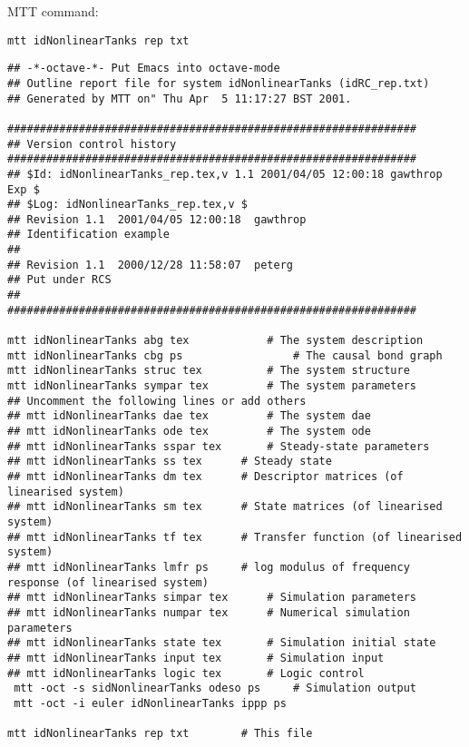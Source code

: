 MTT command:
\begin{verbatim}
mtt idNonlinearTanks rep txt 
\end{verbatim}
  \begin{verbatim}
## -*-octave-*- Put Emacs into octave-mode
## Outline report file for system idNonlinearTanks (idRC_rep.txt)
## Generated by MTT on" Thu Apr  5 11:17:27 BST 2001.

###############################################################
## Version control history
###############################################################
## $Id: idNonlinearTanks_rep.tex,v 1.1 2001/04/05 12:00:18 gawthrop Exp $
## $Log: idNonlinearTanks_rep.tex,v $
## Revision 1.1  2001/04/05 12:00:18  gawthrop
## Identification example
##
## Revision 1.1  2000/12/28 11:58:07  peterg
## Put under RCS
##
###############################################################

mtt idNonlinearTanks abg tex			# The system description
mtt idNonlinearTanks cbg ps 		        # The causal bond graph
mtt idNonlinearTanks struc tex	        # The system structure
mtt idNonlinearTanks sympar tex	        # The system parameters
## Uncomment the following lines or add others
## mtt idNonlinearTanks dae tex	        # The system dae
## mtt idNonlinearTanks ode tex	        # The system ode 
## mtt idNonlinearTanks sspar tex		# Steady-state parameters
## mtt idNonlinearTanks ss tex 		# Steady state
## mtt idNonlinearTanks dm tex		# Descriptor matrices (of linearised system)
## mtt idNonlinearTanks sm tex		# State matrices (of linearised system)
## mtt idNonlinearTanks tf tex		# Transfer function (of linearised system)
## mtt idNonlinearTanks lmfr ps		# log modulus of frequency response (of linearised system)
## mtt idNonlinearTanks simpar tex		# Simulation parameters
## mtt idNonlinearTanks numpar tex		# Numerical simulation parameters
## mtt idNonlinearTanks state tex		# Simulation initial state
## mtt idNonlinearTanks input tex		# Simulation input
## mtt idNonlinearTanks logic tex		# Logic control
 mtt -oct -s sidNonlinearTanks odeso ps		# Simulation output
 mtt -oct -i euler idNonlinearTanks ippp ps

mtt idNonlinearTanks rep txt		# This file
  \end{verbatim}
